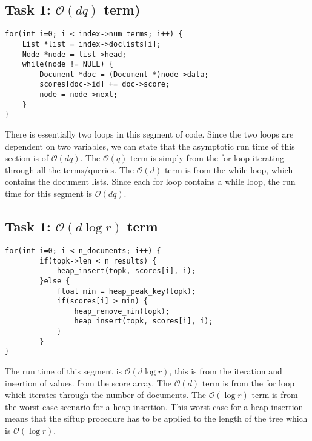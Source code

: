 \documentclass[%
 aip,
 jmp,%
 amsmath,amssymb,
 reprint,%
]{revtex4-1}
\begin{document}
\subsection{\label{sec:level2} Task 1: $\mathcal{O}(dq)$ term)}

\begin{lstlisting}[style=CStyle]
for(int i=0; i < index->num_terms; i++) {
    List *list = index->doclists[i]; 
    Node *node = list->head;
    while(node != NULL) {
    	Document *doc = (Document *)node->data;
    	scores[doc->id] += doc->score;
    	node = node->next;
    }
}
\end{lstlisting}

\begin{center}
    There is essentially two loops in this segment of code.
    Since the two loops are dependent on two variables, we
    can state that the asymptotic run time of this section is
    of $\mathcal{O}(dq)$. The $\mathcal{O}(q)$ term is simply
    from the for loop iterating through all the terms/queries. 
    The $\mathcal{O}(d)$ term is from the while loop, which 
    contains the document lists. Since each for loop contains
    a while loop, the run time for this segment is $\mathcal{O}(dq)$.
\end{center}


\subsection{\label{sec:level3}Task 1: $\mathcal{O}(d\log{}r)$ term}

\begin{lstlisting}[style=CStyle]
for(int i=0; i < n_documents; i++) {
		if(topk->len < n_results) {
			heap_insert(topk, scores[i], i);
		}else {
			float min = heap_peak_key(topk);
			if(scores[i] > min) {
				heap_remove_min(topk);
				heap_insert(topk, scores[i], i);
			}
		}
}
\end{lstlisting}

\begin{center}
    The run time of this segment is $\mathcal{O}(d\log{}r)$, this is
    from the iteration and insertion of values. from the score array.
    The $\mathcal{O}(d)$ term is from the for loop which iterates 
    through the number of documents. The $\mathcal{O}(\log{}r)$ 
    term is from the worst case scenario for a heap insertion. 
    This worst case for a heap insertion means that the siftup
    procedure has to be applied to the length of the tree which is 
    $\mathcal{O}(\log{}r)$.
\end{center}
\end{document}
